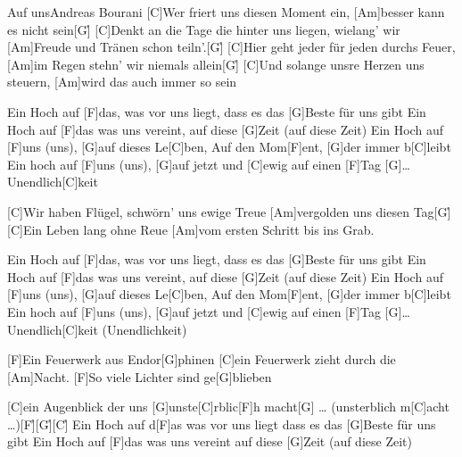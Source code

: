 \documentclass[../main.tex]{subfiles}
\begin{document}
\begin{song}[2]{Auf uns}{Andreas Bourani}{}       
[C]Wer friert uns diesen Moment ein,
[Am]besser kann es nicht sein[G]{\h}
[C]Denkt an die Tage die hinter uns liegen,
wielang' wir [Am]Freude und Tränen schon teiln'.[G]{\h}
[C]Hier geht jeder für jeden durchs Feuer,
[Am]im Regen stehn' wir niemals allein[G]{\h}
[C]Und solange unsre Herzen uns steuern,
[Am]wird das auch immer so sein

Ein Hoch auf [F]das, was vor uns liegt, dass es das [G]Beste für uns gibt
Ein Hoch auf [F]das was uns vereint, auf diese [G]Zeit (auf diese Zeit)
Ein Hoch auf [F]uns (uns), [G]auf dieses Le[C]ben, 
Auf den Mom[F]ent, [G]der immer b[C]leibt
Ein hoch auf [F]uns (uns), [G]auf jetzt und [C]ewig
auf einen [F]Tag [G]{…} Unendlich[C]keit

[C]Wir haben Flügel, schwörn' uns ewige Treue
[Am]vergolden uns diesen Tag[G]{\h}
[C]Ein Leben lang ohne Reue
[Am]vom ersten Schritt bis ins Grab.

Ein Hoch auf [F]das, was vor uns liegt, dass es das [G]Beste für uns gibt
Ein Hoch auf [F]das was uns vereint, auf diese [G]Zeit (auf diese Zeit)
Ein Hoch auf [F]uns (uns), [G]auf dieses Le[C]ben, 
Auf den Mom[F]ent, [G]der immer b[C]leibt
Ein hoch auf [F]uns (uns), [G]auf jetzt und [C]ewig
auf einen [F]Tag [G]{…} Unendlich[C]keit (Unendlichkeit)

[F]Ein Feuerwerk aus Endor[G]phinen
[C]ein Feuerwerk zieht durch die [Am]Nacht.
[F]So viele Lichter sind ge[G]blieben

[C]ein Augenblick der uns [G]unste[C]rblic[F]h macht[G]{ …} (unsterblich m[C]acht …)[F]{\h}[G]{\h}[C]{\h}
Ein Hoch auf d[F]as was vor uns liegt
dass es das [G]Beste für uns gibt
Ein Hoch auf [F]das was uns vereint
auf diese [G]Zeit (auf diese Zeit)

\end{song}
\end{document}
